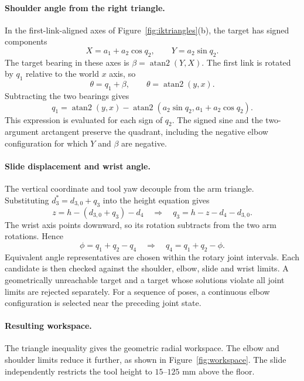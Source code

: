 \documentclass[11pt,a4paper]{article}
\begin{document}
\paragraph{Shoulder angle from the right triangle.}
In the first-link-aligned axes of Figure~\ref{fig:iktriangles}(b), the
target has signed components
\begin{equation}
 X=a_1+a_2\cos q_2,\qquad Y=a_2\sin q_2.
\end{equation}
The target bearing in these axes is $\beta=\operatorname{atan2}(Y,X)$.
The first link is rotated by $q_1$ relative to the world $x$ axis, so
\begin{equation}
 \theta=q_1+\beta,\qquad \theta=\operatorname{atan2}(y,x).
\end{equation}
Subtracting the two bearings gives
\begin{equation}
 \boxed{q_1=\operatorname{atan2}(y,x)
 -\operatorname{atan2}(a_2\sin q_2,a_1+a_2\cos q_2)}.
\end{equation}
This expression is evaluated for each sign of $q_2$. The signed sine and
the two-argument arctangent preserve the quadrant, including the negative
elbow configuration for which $Y$ and $\beta$ are negative.

\paragraph{Slide displacement and wrist angle.}
The vertical coordinate and tool yaw decouple from the arm triangle.
Substituting $d_3^*=d_{3,0}+q_3$ into the height equation gives
\begin{equation}
 z=h-(d_{3,0}+q_3)-d_4
 \quad\Longrightarrow\quad
 \boxed{q_3=h-z-d_4-d_{3,0}}.
\end{equation}
The wrist axis points downward, so its rotation subtracts from the two
arm rotations. Hence
\begin{equation}
 \phi=q_1+q_2-q_4
 \quad\Longrightarrow\quad
 \boxed{q_4=q_1+q_2-\phi}.
\end{equation}
Equivalent angle representatives are chosen within the rotary joint
intervals. Each candidate is then checked against the shoulder, elbow,
slide and wrist limits. A geometrically unreachable target and a target
whose solutions violate all joint limits are rejected separately. For a
sequence of poses, a continuous elbow configuration is selected near the
preceding joint state.

\paragraph{Resulting workspace.}
The triangle inequality gives the geometric radial workspace. The elbow
and shoulder limits reduce it further, as shown in
Figure~\ref{fig:workspace}. The slide independently restricts the tool
height to $15$--$125$ mm above the floor.
\end{document}
